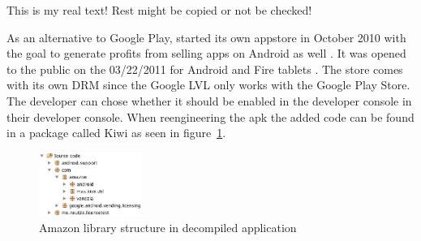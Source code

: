 This is my real text! Rest might be copied or not be checked!

As an alternative to Google Play, started its own appstore in October 2010 with the goal to generate profits from selling apps on Android as well \cite{amazonBeta}.
It was opened to the public on the 03/22/2011 for Android and Fire tablets \cite{amazonRelease}.
The store comes with its own DRM since the Google LVL only works with the Google Play Store.
The developer can chose whether it should be enabled in the developer console  in their developer console.
When reengineering the \gls{apk} the added code can be found in a package called Kiwi as seen in figure~\ref{fig:amazonFolder}. \cite{amazonDeveloper}
\begin{figure}[h]
    \centering
    \includegraphics[width=0.3\textwidth]{data/amazonFolder.png}
    \caption{Amazon library structure in decompiled application}
    \label{fig:amazonFolder}
\end{figure}
